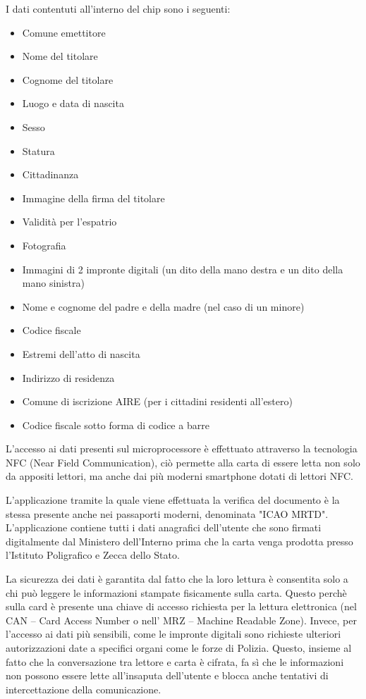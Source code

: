 I dati contentuti all'interno del chip sono i seguenti:
\begin{itemize}
    \item Comune emettitore
    \item Nome del titolare
    \item Cognome del titolare
    \item Luogo e data di nascita
    \item Sesso
    \item Statura
    \item Cittadinanza
    \item Immagine della firma del titolare
    \item Validità per l’espatrio
    \item Fotografia
    \item Immagini di 2 impronte digitali (un dito della mano destra e un dito della mano sinistra)
    \item Nome e cognome del padre e della madre (nel caso di un minore)
    \item Codice fiscale
    \item Estremi dell’atto di nascita
    \item Indirizzo di residenza
    \item Comune di iscrizione AIRE (per i cittadini residenti all’estero)
    \item Codice fiscale sotto forma di codice a barre
\end{itemize}

L'accesso ai dati presenti sul microprocessore è effettuato attraverso la tecnologia NFC  (Near Field Communication), ciò permette alla carta di essere letta non solo da appositi lettori, ma anche dai più moderni smartphone dotati di lettori NFC.

L'applicazione tramite la quale viene effettuata la verifica del documento è la stessa presente anche nei passaporti moderni, denominata "ICAO MRTD". L'applicazione contiene tutti i dati anagrafici dell'utente che sono firmati digitalmente dal Ministero dell’Interno prima che la carta venga prodotta presso l’Istituto Poligrafico e Zecca dello Stato.

La sicurezza dei dati è garantita dal fatto che la loro lettura è consentita solo a chi può leggere le informazioni stampate fisicamente sulla carta. Questo perchè sulla card è presente una chiave di accesso richiesta per la lettura elettronica (nel CAN – Card Access Number o nell’ MRZ – Machine Readable Zone). Invece, per l'accesso ai dati più sensibili, come le impronte digitali sono richieste ulteriori autorizzazioni date a specifici organi come le forze di Polizia. Questo, insieme al fatto che la conversazione tra lettore e carta è cifrata, fa sì che le informazioni non possono essere lette all'insaputa dell'utente e blocca anche tentativi di intercettazione della comunicazione.
\cite{cie}

